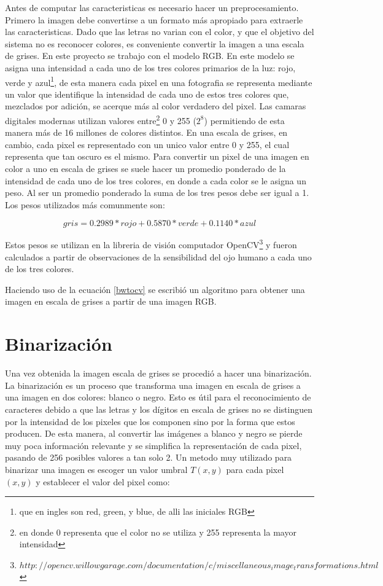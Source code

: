 \documentclass[a4paper, 11pt, oneside]{report}
\begin{document}
Antes de computar las caracteristicas es necesario hacer un preprocesamiento. Primero la imagen debe convertirse a un formato más apropiado para extraerle las caracteristicas. Dado que las letras no varian con el color, y que el objetivo del sistema no es reconocer colores, es conveniente convertir la imagen a una escala de grises. En este proyecto se trabajo con el modelo RGB. En este modelo se asigna una intensidad a cada uno de los tres colores primarios de la luz: rojo, verde y azul\footnote{que en ingles son red, green, y blue, de alli las iniciales RGB}, de esta manera cada pixel en una fotografia se representa mediante un valor que identifique la intensidad de cada uno de estos tres colores que, mezclados por adición, se acerque más al color verdadero del pixel. Las camaras digitales modernas utilizan valores entre\footnote{en donde 0 representa que el color no se utiliza y 255 representa la mayor intensidad} 0 y 255 ($2^8$) permitiendo de esta manera más de 16 millones de colores distintos. En una escala de grises, en cambio, cada pixel es representado con un unico valor entre 0 y 255, el cual representa que tan oscuro es el mismo. Para convertir un pixel de una imagen en color a uno en escala de grises se suele hacer un promedio ponderado de la intensidad de cada uno de los tres colores, en donde a cada color se le asigna un peso. Al ser un promedio ponderado la suma de los tres pesos debe ser igual a 1. Los pesos utilizados más comunmente son:

\begin{equation}\label{bwtocv}
	gris = 0.2989 * rojo + 0.5870 * verde + 0.1140 * azul 
\end{equation}

Estos pesos se utilizan en la libreria de visión computador OpenCV\footnote{$http://opencv.willowgarage.com/documentation/c/miscellaneous_image_transformations.html$} y fueron calculados a partir de observaciones de la sensibilidad del ojo humano a cada uno de los tres colores. 

Haciendo uso de la ecuación \eqref{bwtocv} se escribió un algoritmo para obtener una imagen en escala de grises a partir de una imagen RGB. 

\section{Binarización}
\label{sect:binarization}

Una vez obtenida la imagen escala de grises se procedió a hacer una binarización. La binarización es un proceso que transforma una imagen en escala de grises a una imagen en dos colores: blanco o negro. Esto es útil para el reconocimiento de caracteres debido a que las letras y los dígitos en escala de grises no se distinguen por la intensidad de los pixeles que los componen sino por la forma que estos producen. De esta manera, al convertir las imágenes a blanco y negro se pierde muy poca información relevante y se simplifica la representación de cada pixel, pasando de 256 posibles valores a tan solo 2. Un metodo muy utilizado para binarizar una imagen es escoger un valor umbral $T(x,y)$ para cada pixel $(x,y)$ y establecer el valor del pixel como:
\end{document}
